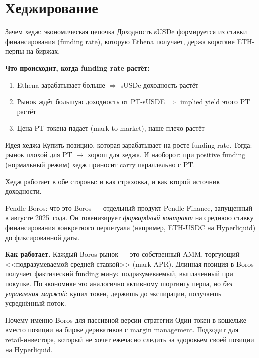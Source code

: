 \documentclass[11pt,aspectratio=169]{beamer}
\begin{document}
\section{Хеджирование}

\begin{frame}{Зачем хедж: экономическая цепочка}
  Доходность sUSDe формируется из ставки финансирования (funding rate),
  которую Ethena получает, держа короткие ETH-перпы на биржах.

  \vspace{0.4em}
  \textbf{Что происходит, когда funding rate растёт:}
  \begin{enumerate}\itemsep0.2em
    \item Ethena зарабатывает больше $\Rightarrow$ sUSDe доходность растёт
    \item Рынок ждёт большую доходность от PT-sUSDE $\Rightarrow$
          implied yield этого PT растёт
    \item Цена PT-токена падает (mark-to-market), наше плечо растёт
  \end{enumerate}

  \vspace{0.4em}
  \begin{block}{Идея хеджа}
    Купить позицию, которая зарабатывает на росте funding rate.
    Тогда: рынок плохой для PT $\to$ хорош для хеджа. И наоборот:
    при positive funding (нормальный режим) хедж приносит carry
    параллельно с PT.
  \end{block}

  \vspace{0.4em}
  Хедж работает в обе стороны: и как страховка, и как второй
  источник доходности.
\end{frame}

\begin{frame}{Pendle Boros: что это}
  Boros --- отдельный продукт Pendle Finance, запущенный в августе
  2025~года. Он токенизирует \emph{форвардный контракт} на среднюю
  ставку финансирования конкретного перпетуала (например, ETH-USDC
  на Hyperliquid) до фиксированной даты.

  \vspace{0.4em}
  \textbf{Как работает.} Каждый Boros-рынок --- это собственный AMM,
  торгующий <<подразумеваемой средней ставкой>> (mark APR). Длинная
  позиция в Boros получает фактический funding минус подразумеваемый,
  выплаченный при покупке. По экономике это аналогично активному
  шортингу перпа, но \emph{без управления маржой}: купил токен,
  держишь до экспирации, получаешь усреднённый поток.

  \vspace{0.4em}
  \begin{block}{Почему именно Boros для пассивной версии стратегии}
    Один токен в кошельке вместо позиции на бирже деривативов с
    margin management. Подходит для retail-инвестора, который не
    хочет ежечасно следить за здоровьем своей позиции на Hyperliquid.
  \end{block}
\end{frame}
\end{document}
